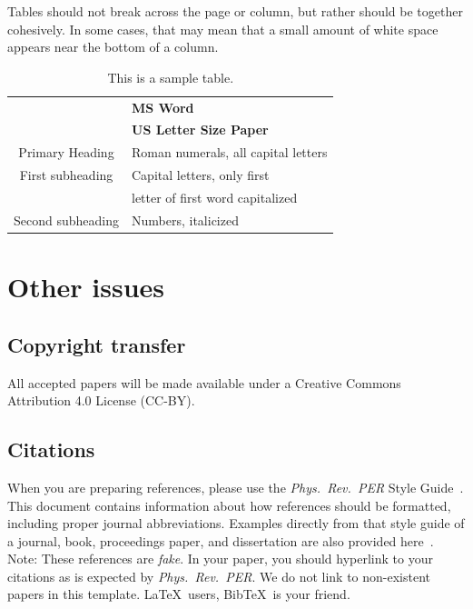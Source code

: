 \documentclass[english,aps,prstper,reprint,showpacs,titlepage,longbibliography]{revtex4-2}
\begin{document}
Tables should not break across the page or column, but rather should be together cohesively.
In some cases, that may mean that a small amount of white space appears near the bottom of a
column.

\begin{table}[htbp]
  \caption{This is a sample table.\label{tab1}}
  \begin{ruledtabular}
    \begin{tabular}{cl}
      & \textbf{MS Word} \\ 
      & \textbf{US Letter Size Paper} \\ 
      \hline
      Primary Heading & Roman numerals, all capital letters \\
      First subheading & Capital letters, only first \\
      & letter of first word capitalized \\
      Second subheading & Numbers, italicized 
    \end{tabular}
  \end{ruledtabular}
\end{table}


\section{Other issues}
\subsection{Copyright transfer}
All accepted papers will be made available under a Creative Commons Attribution 4.0 License
(CC-BY).

\subsection{Citations}
When you are preparing references, please use the \textit{Phys.\ Rev.\ PER} Style
Guide~\cite{style-guide}.  This document contains information about how references should be
formatted, including proper journal abbreviations.  Examples directly from that style guide of
a journal, book, proceedings paper, and dissertation are also provided
here~\cite{DeBoerHistory,RIOT}.  Note: These references are \textit{fake}.
In your paper, you should hyperlink to your citations as is expected by \textit{Phys.\ Rev.\
  PER}.  We do not link to non-existent papers in this template.  \LaTeX\ users, Bib\TeX\ is
your friend.
\end{document}
